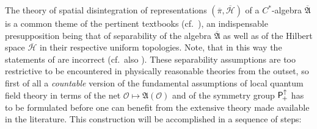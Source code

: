 \documentclass[11pt,twoside,openright]{report}
\theoremstyle{definition}
\theoremstyle{plain}
\theoremstyle{remark}
\theoremstyle{assumption}
\newcommand{\Oscr}{\mathscr{O}}
\newcommand{\Afrakbar}{\overline{\mathfrak{A}}}
\newcommand{\Hscrbar}{\overline{\mathscr{H}}}
\newcommand{\pibar}{\overline{\pi}}
\newcommand{\Poin}{\mathsf{P}_{\negthinspace +}^\uparrow}
\newcommand{\AO}{\mathfrak{A} ( \mathscr{O} )}
\begin{document}
The theory of spatial disintegration of representations $( \pibar ,
\Hscrbar )$ of a $C^*$-algebra $\Afrakbar$ is a common theme of the
pertinent textbooks (cf.~\cite{dixmier:1981,dixmier:1982,%
takesaki:1979,pedersen:1979,bratteli/robinson:1987}), an indispensable
presupposition being that of separability of the algebra $\Afrakbar$
as well as of the Hilbert space $\Hscrbar$ in their respective uniform
topologies. Note, that in this way the statements of
\cite[Section~4.4]{bratteli/robinson:1987} are incorrect (cf.~also
\cite[Corrigenda]{bratteli/robinson:1997}). These separability
assumptions are too restrictive to be encountered in physically
reasonable theories from the outset, so first of all a
\emph{countable} version of the fundamental assumptions of local
quantum field theory in terms of the net $\Oscr \mapsto \AO$ and of
the symmetry group $\Poin$ has to be formulated before one can benefit
from the extensive theory made available in the literature. This
construction will be accomplished in a sequence of steps:
\end{document}
